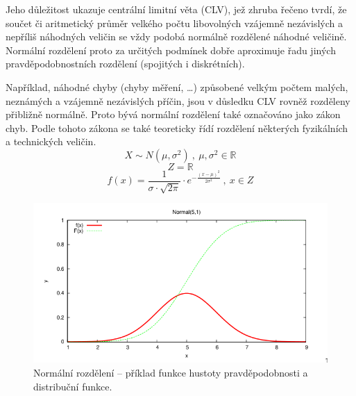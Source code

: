 \begin{compactitem}
    \item Jeho důležitost ukazuje centrální limitní věta (CLV), jež zhruba řečeno tvrdí, že součet či aritmetický průměr velkého počtu libovolných vzájemně nezávislých a nepříliš  náhodných veličin se vždy podobá normálně rozdělené náhodné veličině. Normální rozdělení proto za určitých podmínek dobře aproximuje řadu jiných pravděpodobnostních rozdělení (spojitých i diskrétních).
    \item Například, náhodné chyby (chyby měření, \dots) způsobené velkým počtem malých, neznámých a vzájemně nezávislých příčin, jsou v důsledku CLV rovněž rozděleny přibližně normálně. Proto bývá normální rozdělení také označováno jako zákon chyb. Podle tohoto zákona se také teoreticky řídí rozdělení některých fyzikálních a technických veličin.
    $$ X \sim N(\mu, \sigma^2) ~,~ \mu, \sigma^2 \in \mathbb{R} $$
    $$ Z = \mathbb{R} $$
    $$ f(x) = \frac{1}{\sigma \cdot \sqrt{2 \pi}} \cdot e^{- \frac{(x-\mu)^2}{2 \sigma^2}} ~,~ x \in Z
    $$
\end{compactitem}

\begin{figure}[H]
    \centering
    \includegraphics[width=1\linewidth]{snp_normalni.png}
    \caption{Normální rozdělení -- příklad funkce hustoty pravděpodobnosti a distribuční funkce.}
\end{figure}
